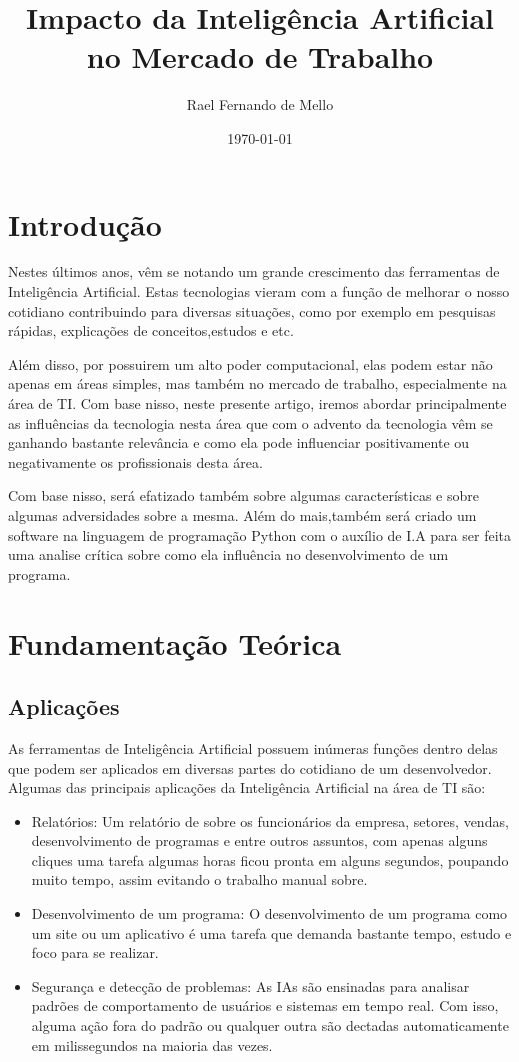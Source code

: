 \documentclass[12pt]{article}
\title{Impacto da Inteligência Artificial no Mercado de Trabalho}
\author{Rael Fernando de Mello}
\date{\today}
\begin{document}
\maketitle

\section{Introdução}

    Nestes últimos anos, vêm se notando um grande crescimento das ferramentas de Inteligência Artificial. Estas tecnologias vieram com a função de melhorar o nosso cotidiano contribuindo para diversas situações, como por exemplo em pesquisas rápidas, explicações de conceitos,estudos e etc.

    Além disso, por possuirem um alto poder computacional, elas podem estar não apenas em áreas simples, mas também no mercado de trabalho, especialmente na área de TI. Com base nisso, neste presente artigo, iremos abordar principalmente as influências da tecnologia nesta área que com o advento da tecnologia vêm se ganhando bastante relevância e como ela pode influenciar positivamente ou negativamente os profissionais desta área.

    Com base nisso, será efatizado também sobre algumas características e sobre algumas adversidades sobre a mesma. Além do mais,também será criado um software na linguagem de programação Python com o auxílio de I.A para ser feita uma analise crítica sobre como ela influência no desenvolvimento de um programa.
\section{Fundamentação Teórica}
    \subsection{Aplicações}
        As ferramentas de Inteligência Artificial possuem inúmeras funções dentro delas que podem ser aplicados em diversas partes do cotidiano de um desenvolvedor. Algumas das principais aplicações da Inteligência Artificial na área de TI são:
        \begin{itemize}
            \item Relatórios: Um relatório de sobre os funcionários da empresa, setores, vendas, desenvolvimento de programas e entre outros assuntos, com apenas alguns cliques uma tarefa algumas horas ficou pronta em alguns segundos, poupando muito tempo, assim evitando o trabalho manual sobre.
            \item Desenvolvimento de um programa: O desenvolvimento de um programa como um site ou um aplicativo é uma tarefa que demanda bastante tempo, estudo e foco para se realizar.
            \item Segurança e detecção de problemas: As IAs são ensinadas para analisar padrões de comportamento de usuários e sistemas em tempo real. Com isso, alguma ação fora do padrão ou qualquer outra são dectadas automaticamente em milissegundos na maioria das vezes.  
        \end{itemize}
\end{document}
